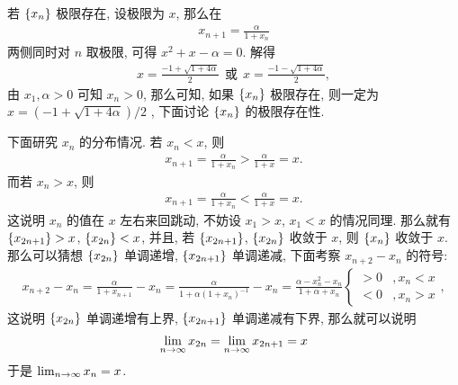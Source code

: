\begin{exercise}[resume=exer]
\begin{answer}
            若 $ \qty{x_{n}} $ 极限存在, 设极限为 $ x $, 那么在
            \begin{align*}
                x_{n + 1} = \frac{\alpha}{1 + x_{n}}
            \end{align*}
            两侧同时对 $ n $ 取极限, 可得 $ x^{2} + x - \alpha = 0 $. 解得
            \begin{align*}
                x = \frac{-1 + \sqrt{1 + 4\alpha}}{2} \ \ \text{或}\ \  x = \frac{-1 - \sqrt{1 + 4\alpha}}{2},
            \end{align*}
            由 $ x_{1}, \alpha > 0 $ 可知 $ x_{n} > 0 $, 那么可知, 如果 $ \qty{x_{n}} $ 极限存在, 则一定为 $ x = (-1 + \sqrt{1 + 4\alpha})/2 $ , 下面讨论 $ \qty{x_{n}} $ 的极限存在性. 
            
            下面研究 $ x_{n} $ 的分布情况. 若 $ x_{n} < x $, 则
            \begin{align*}
                x_{n + 1} = \frac{\alpha}{1 + x_{n}} > \frac{\alpha}{1 + x} = x.
            \end{align*}
            而若 $ x_{n} > x $, 则
            \begin{align*}
                x_{n + 1} = \frac{\alpha}{1 + x_{n}} < \frac{\alpha}{1 + x} = x.
            \end{align*}
            这说明 $ x_{n} $ 的值在 $ x $ 左右来回跳动, 不妨设 $ x_{1} > x $, $ x_{1} < x $ 的情况同理. 那么就有 $ \qty{x_{2n + 1}} > x $, $ \qty{x_{2n}} < x $, 并且, 若 $ \qty{x_{2n + 1}} $, $ \qty{x_{2n}} $ 收敛于 $ x $, 则 $ \qty{x_{n}} $ 收敛于 $ x $.
            那么可以猜想 $ \qty{x_{2n}} $ 单调递增, $ \qty{x_{2n + 1}} $ 单调递减, 下面考察 $ x_{n + 2} - x_{n} $ 的符号:
            \begin{align*}
                x_{n + 2} - x_{n} = \frac{\alpha}{1 + x_{n + 1}} - x_{n} = \frac{\alpha}{1 + \alpha(1 + x_{n})^{-1}} - x_{n} = \frac{\alpha - x_{n}^{2} - x_{n}}{1 + \alpha + x_{n}}
                \begin{cases}
                    > 0 & , x_{n} < x\\
                    < 0 & , x_{n} > x
                \end{cases},
            \end{align*}
            这说明 $ \qty{x_{2n}} $ 单调递增有上界, $ \qty{x_{2n + 1}} $ 单调递减有下界, 那么就可以说明
            \begin{align*}
                \lim_{n \to \infty}x_{2n} = \lim_{n \to \infty}x_{2n + 1} = x
            \end{align*} 
            于是 $ \lim_{n \to \infty}x_{n} = x $.
        \end{answer}
    \end{exercise}
    \stopexercise